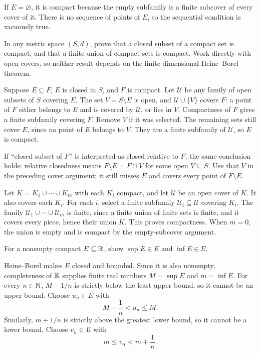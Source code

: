 If $E=\varnothing$, it is compact because the empty subfamily
is a finite subcover of every cover of it. There is no sequence
of points of $E$, so the sequential condition is vacuously true.

\goal In any metric space $(S,d)$, prove that a closed subset
of a compact set is compact, and that a finite union of compact
sets is compact.
\idea Work directly with open covers, so neither result depends
on the finite-dimensional Heine--Borel theorem.

Suppose $E\subseteq F$, $E$ is closed in $S$, and $F$ is
compact. Let $\mathcal U$ be any family of open subsets of
$S$ covering $E$. The set $V=S\setminus E$ is open, and
$\mathcal U\cup\{V\}$ covers $F$: a point of $F$ either
belongs to $E$ and is covered by $\mathcal U$, or lies in $V$.
Compactness of $F$ gives a finite subfamily covering $F$.
Remove $V$ if it was selected. The remaining sets still cover
$E$, since no point of $E$ belongs to $V$. They are a finite
subfamily of $\mathcal U$, so $E$ is compact.

If ``closed subset of $F$'' is interpreted as closed relative
to $F$, the same conclusion holds: relative closedness means
$F\setminus E=F\cap V$ for some open $V\subseteq S$.
Use that $V$ in the preceding cover argument; it still misses
$E$ and covers every point of $F\setminus E$.

Let $K=K_1\cup\cdots\cup K_m$ with each $K_i$ compact,
and let $\mathcal U$ be an open cover of $K$.
It also covers each $K_i$. For each $i$, select a finite
subfamily $\mathcal U_i\subseteq\mathcal U$ covering $K_i$.
The family $\mathcal U_1\cup\cdots\cup\mathcal U_m$ is
finite, since a finite union of finite sets is finite, and
it covers every piece, hence their union $K$. This proves
compactness. When $m=0$, the union is empty and is compact
by the empty-subcover argument.

\goal For a nonempty compact $E\subseteq\mathbb{R}$, show
$\sup E\in E$ and $\inf E\in E$.

Heine--Borel makes $E$ closed and bounded. Since it is also
nonempty, completeness of $\mathbb{R}$ supplies finite real numbers
$M=\sup E$ and $m=\inf E$.
For every $n\in\mathbb{N}$, $M-1/n$ is strictly below the least
upper bound, so it cannot be an upper bound. Choose $u_n\in E$
with
\[
 M-\frac1n<u_n\le M.
\]
Similarly, $m+1/n$ is strictly above the greatest lower bound,
so it cannot be a lower bound. Choose $v_n\in E$ with
\[
 m\le v_n<m+\frac1n.
\]

